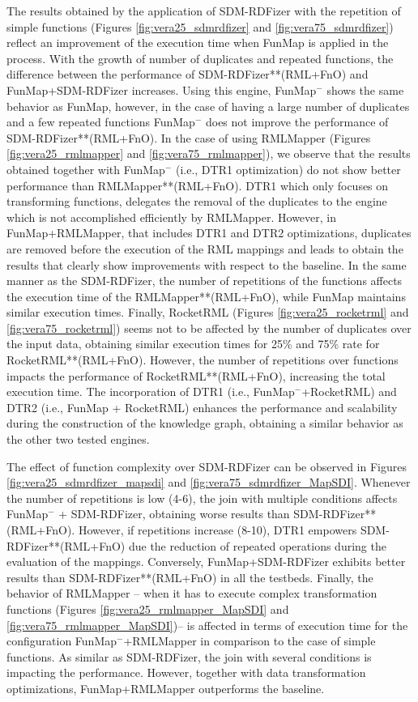 The results obtained by the application of SDM-RDFizer with the repetition of simple functions (Figures \ref{fig:vera25_sdmrdfizer} and \ref{fig:vera75_sdmrdfizer}) reflect an improvement of the execution time when FunMap is applied in the process. With the growth of number of duplicates and repeated functions, the difference between the performance of SDM-RDFizer**(RML+FnO) and FunMap+SDM-RDFizer increases. Using this engine, FunMap$^-$ shows the same behavior as FunMap, however, in the case of having a large number of duplicates and a few repeated functions FunMap$^-$ does not improve the performance of SDM-RDFizer**(RML+FnO). 
In the case of using RMLMapper (Figures \ref{fig:vera25_rmlmapper} and \ref{fig:vera75_rmlmapper}), we observe that the results obtained together with FunMap$^-$ (i.e., DTR1 optimization) do not show better performance than RMLMapper**(RML+FnO). DTR1 which only focuses on transforming functions, delegates the removal of the duplicates to the engine which is not accomplished efficiently by RMLMapper. However, in FunMap+RMLMapper, that includes DTR1 and DTR2 optimizations, duplicates are removed before the execution of the RML mappings and leads to obtain the results that clearly show improvements with respect to the baseline. In the same manner as the SDM-RDFizer, the number of repetitions of the functions affects the execution time of the RMLMapper**(RML+FnO), while FunMap maintains similar execution times. Finally, RocketRML (Figures \ref{fig:vera25_rocketrml} and \ref{fig:vera75_rocketrml}) seems not to be affected by the number of duplicates over the input data, obtaining similar execution times for 25\% and 75\% rate for RocketRML**(RML+FnO). However, the number of repetitions over functions impacts the performance of RocketRML**(RML+FnO), increasing the total execution time. The incorporation of DTR1 (i.e., FunMap$^-$+RocketRML) and DTR2 (i.e., FunMap + RocketRML) enhances the performance and scalability during the construction of the knowledge graph, obtaining a similar behavior as the other two tested engines. 

The effect of function complexity over SDM-RDFizer can be observed in Figures \ref{fig:vera25_sdmrdfizer_mapsdi} and \ref{fig:vera75_sdmrdfizer_MapSDI}. Whenever the number of repetitions is low (4-6), the join with multiple conditions affects FunMap$^-$ + SDM-RDFizer, obtaining worse results than SDM-RDFizer**(RML+FnO). However, if repetitions increase (8-10), DTR1 empowers SDM-RDFizer**(RML+FnO) due the reduction of repeated operations during the evaluation of the mappings. Conversely, FunMap+SDM-RDFizer exhibits better results than SDM-RDFizer**(RML+FnO) in all the testbeds. Finally, the behavior of RMLMapper -- when it has to execute complex transformation functions (Figures \ref{fig:vera25_rmlmapper_MapSDI} and \ref{fig:vera75_rmlmapper_MapSDI})-- is affected in terms of execution time for the configuration FunMap$^-$+RMLMapper in comparison to the case of simple functions. As similar as SDM-RDFizer, the join with several conditions is impacting the performance. However, together with data transformation optimizations, FunMap+RMLMapper outperforms the baseline. 

